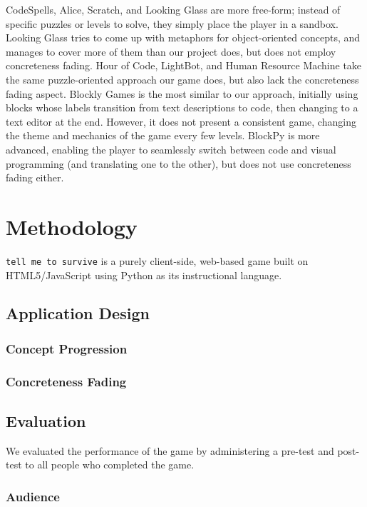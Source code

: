 \documentclass[12pt,notitlepage]{article}
\newcommand\tmts[0]{\texttt{tell me to survive}}
\begin{document}
CodeSpells, Alice, Scratch, and Looking Glass are more free-form;
instead of specific puzzles or levels to solve, they simply place the
player in a sandbox. Looking Glass tries to come up with metaphors for
object-oriented concepts, and manages to cover more of them than our
project does, but does not employ concreteness fading. Hour of Code,
LightBot, and Human Resource Machine take the same puzzle-oriented
approach our game does, but also lack the concreteness fading
aspect. Blockly Games is the most similar to our approach, initially
using blocks whose labels transition from text descriptions to code,
then changing to a text editor at the end. However, it does not
present a consistent game, changing the theme and mechanics of the
game every few levels. BlockPy is more advanced, enabling the player
to seamlessly switch between code and visual programming (and
translating one to the other), but does not use concreteness fading
either.

\section{Methodology}

\tmts{} is a purely client-side, web-based game built on
HTML5/JavaScript using Python as its instructional language.

\subsection{Application Design}

\subsubsection{Concept Progression}

\subsubsection{Concreteness Fading}

\subsection{Evaluation}

We evaluated the performance of the game by administering a pre-test
and post-test to all people who completed the game.

\subsubsection{Audience}
\end{document}
